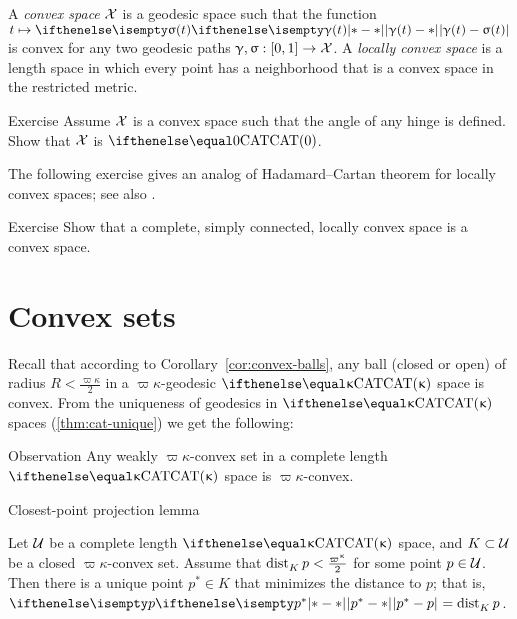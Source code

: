 A \emph{convex space} $\mathcal{X}$ is a geodesic space such that the function
$t\mapsto\dist{\gamma(t)}{\sigma(t)}{}$ is convex 
for any two  geodesic paths $\gamma,\sigma:[0,1]\to \spc{X}$.  
A \emph{locally convex space} is a length space in which every point has a neighborhood that is a convex space in the restricted metric.


\begin{thm}{Exercise}\label{ex:cats-cradle}
Assume $\mathcal{X}$ is a convex space 
such that the angle of any hinge is defined.
Show that $\mathcal{X}$ is $\CAT{0}$.
\end{thm}

The following exercise gives an analog of Hadamard--Cartan theorem for locally convex spaces;
see also \cite{alexander-bishop:h-c}.

\begin{thm}{Exercise}\label{ex:Hadamard--Cartan}
Show that a complete, simply connected, locally convex space is a convex space.
\end{thm}

\section{Convex sets}
\label{sec:convex-CBA}

Recall that according to Corollary~\ref{cor:convex-balls}, any ball (closed or open) of radius $R<\tfrac{\varpi\kappa}2$ in a $\varpi\kappa$-geodesic $\CAT\kappa$ space is convex.
From the uniqueness of geodesics in $\CAT\kappa$ spaces (\ref{thm:cat-unique}) we get the following:

\begin{thm}{Observation}
Any weakly $\varpi\kappa$-convex set 
in a complete length $\CAT\kappa$ space is $\varpi\kappa$-convex.
\end{thm}


\begin{thm}{Closest-point projection lemma}\label{lem:closest point}{\sloppy 
Let $\mathcal{U}$ be a complete length $\CAT\kappa$ space, and $K\subset \spc{U}$ be a closed $\varpi\kappa$-convex set. 
Assume that $\distfun{K}{p}{}<\tfrac{\varpi\kappa}2$ for some point $p\in \spc{U}$.
Then  
there is a unique point $p^*\in K$ that minimizes the distance to $p$;
that is, $\dist{p^*}{p}{}=\distfun{K}{p}{}$. 

}

\end{thm}

